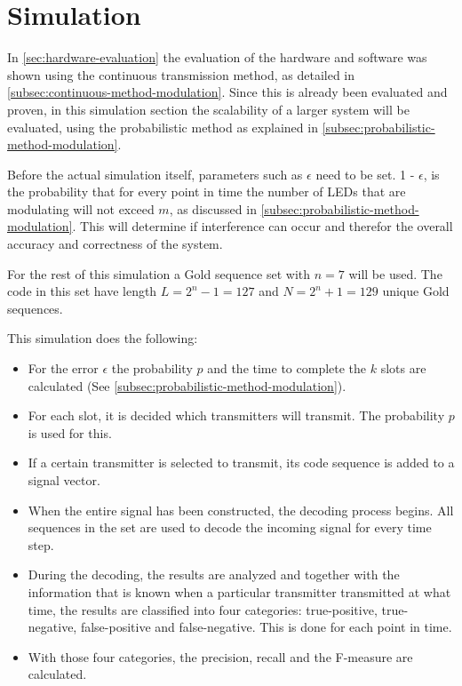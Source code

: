 
\section{Simulation}
\label{sec:simulation-evaluation}

In \autoref{sec:hardware-evaluation} the evaluation of the hardware and software was shown using the continuous transmission method, as detailed in \autoref{subsec:continuous-method-modulation}.
Since this is already been evaluated and proven, in this simulation section the scalability of a larger system will be evaluated, using the probabilistic method as explained in \autoref{subsec:probabilistic-method-modulation}.


Before the actual simulation itself, parameters such as $\epsilon$ need to be set.
1 - $\epsilon$, is the probability that for every point in time the number of LEDs that are modulating will not exceed $m$, as discussed in \autoref{subsec:probabilistic-method-modulation}.
This will determine if interference can occur and therefor the overall accuracy and correctness of the system.

For the rest of this simulation a Gold sequence set with $n = 7$ will be used.
The code in this set have length $L = 2^n - 1 = 127$ and $N = 2^n + 1 = 129$ unique Gold sequences.

This simulation does the following: 

\begin{itemize}

	\item For the error $\epsilon$ the probability $p$ and the time to complete the $k$ slots are calculated (See \autoref{subsec:probabilistic-method-modulation}).

	\item For each slot, it is decided which transmitters will transmit. The probability $p$ is used for this.

	\item If a certain transmitter is selected to transmit, its code sequence is added to a signal vector.

	\item When the entire signal has been constructed, the decoding process begins. All sequences in the set are used to decode the incoming signal for every time step.

	\item During the decoding, the results are analyzed and together with the information that is known when a particular transmitter transmitted at what time, the results are classified into four categories: true-positive, true-negative, false-positive and false-negative. This is done for each point in time.

	\item With those four categories, the precision, recall and the F-measure are calculated.



\end{itemize}




